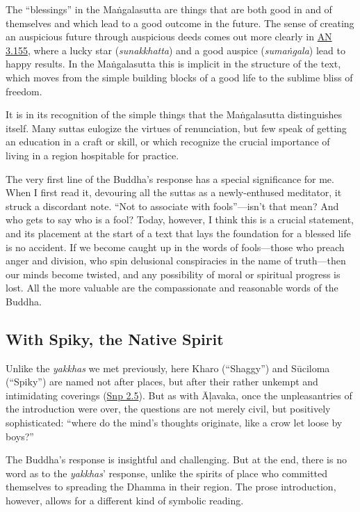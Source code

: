 \documentclass[12pt,openany]{book}%
\begin{document}
The “blessings” in the \textsanskrit{Maṅgalasutta} are things that are both good in and of themselves and which lead to a good outcome in the future. The sense of creating an auspicious future through auspicious deeds comes out more clearly in \href{https://suttacentral.net/an3.155/en/sujato}{AN 3.155}, where a lucky star (\textit{sunakkhatta}) and a good auspice (\textit{\textsanskrit{sumaṅgala}}) lead to happy results. In the \textsanskrit{Maṅgalasutta} this is implicit in the structure of the text, which moves from the simple building blocks of a good life to the sublime bliss of freedom.

It is in its recognition of the simple things that the \textsanskrit{Maṅgalasutta} distinguishes itself. Many suttas eulogize the virtues of renunciation, but few speak of getting an education in a craft or skill, or which recognize the crucial importance of living in a region hospitable for practice.

The very first line of the Buddha’s response has a special significance for me. When I first read it, devouring all the suttas as a newly-enthused meditator, it struck a discordant note. “Not to associate with fools”—isn’t that mean? And who gets to say who is a fool? Today, however, I think this is a crucial statement, and its placement at the start of a text that lays the foundation for a blessed life is no accident. If we become caught up in the words of fools—those who preach anger and division, who spin delusional conspiracies in the name of truth—then our minds become twisted, and any possibility of moral or spiritual progress is lost. All the more valuable are the compassionate and reasonable words of the Buddha.

\subsection*{With Spiky, the Native Spirit}

Unlike the \textit{yakkhas} we met previously, here Kharo (“Shaggy”) and \textsanskrit{Sūciloma} (“Spiky”) are named not after places, but after their rather unkempt and intimidating coverings (\href{https://suttacentral.net/snp2.5/en/sujato}{Snp 2.5}). But as with \textsanskrit{Āḷavaka}, once the unpleasantries of the introduction were over, the questions are not merely civil, but positively sophisticated: “where do the mind’s thoughts originate, like a crow let loose by boys?”

The Buddha’s response is insightful and challenging. But at the end, there is no word as to the \textit{yakkhas}’ response, unlike the spirits of place who committed themselves to spreading the Dhamma in their region. The prose introduction, however, allows for a different kind of symbolic reading.
\end{document}
